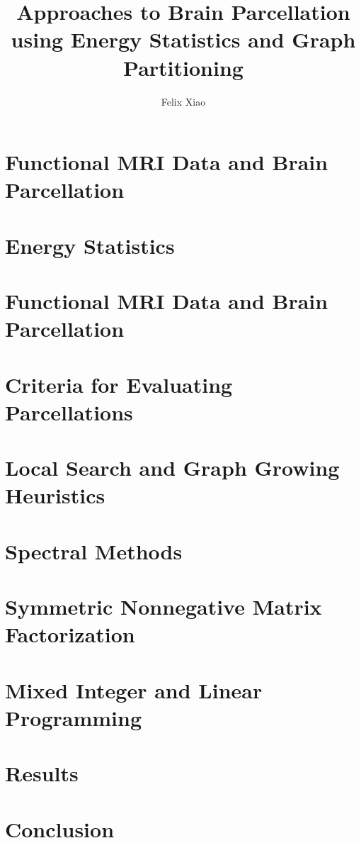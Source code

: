 \documentclass[12pt,lot,lof]{puthesis_undergraduate}
\title{Approaches to Brain Parcellation using Energy Statistics and Graph Partitioning}
\author{Felix Xiao}
\begin{document}
\chapter{Functional MRI Data and Brain Parcellation}


\chapter{Energy Statistics}


\chapter{Functional MRI Data and Brain Parcellation}


%

\chapter{Criteria for Evaluating Parcellations}


\chapter{Local Search and Graph Growing Heuristics}


\chapter{Spectral Methods}


\chapter{Symmetric Nonnegative Matrix Factorization}


\chapter{Mixed Integer and Linear Programming}


\chapter{Results}

\chapter{Conclusion}



\end{document}
